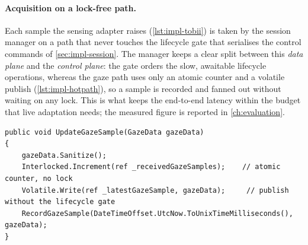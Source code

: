 \paragraph{Acquisition on a lock-free path.}
Each sample the sensing adapter raises (\cref{lst:impl-tobii}) is taken by the session manager on a path that never touches the lifecycle gate that serialises the control commands of \cref{sec:impl-session}.
The manager keeps a clear split between this \emph{data plane} and the \emph{control plane}: the gate orders the slow, awaitable lifecycle operations, whereas the gaze path uses only an atomic counter and a volatile publish (\cref{lst:impl-hotpath}), so a sample is recorded and fanned out without waiting on any lock.
This is what keeps the end-to-end latency within the budget that live adaptation needs; the measured figure is reported in \cref{ch:evaluation}.

\begin{listing}[htbp]
\begin{verbatim}
public void UpdateGazeSample(GazeData gazeData)
{
    gazeData.Sanitize();
    Interlocked.Increment(ref _receivedGazeSamples);    // atomic counter, no lock
    Volatile.Write(ref _latestGazeSample, gazeData);     // publish without the lifecycle gate
    RecordGazeSample(DateTimeOffset.UtcNow.ToUnixTimeMilliseconds(), gazeData);
}
\end{verbatim}
\caption{Lock-free gaze ingest (from \texttt{ExperimentSessionManager.Gaze.cs}): atomic counter and \texttt{Volatile} publish on the data plane, bypassing the lifecycle gate.}
\label{lst:impl-hotpath}
\end{listing}

